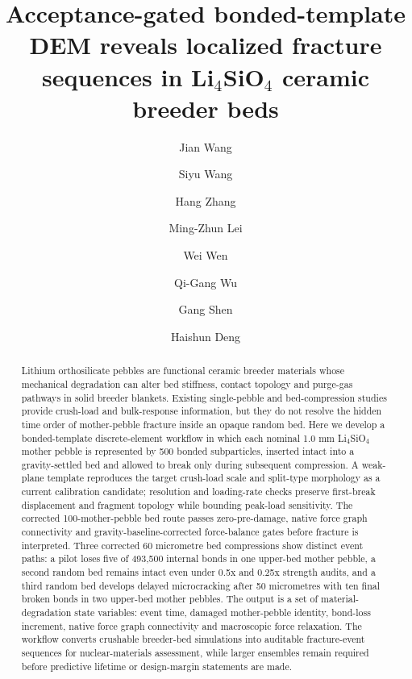 \documentclass[5p,twocolumn]{elsarticle}
\def\corref#1{}%
\begin{document}
\begin{frontmatter}
\title{\texorpdfstring{Acceptance-gated bonded-template DEM reveals localized fracture sequences in Li$_4$SiO$_4$ ceramic breeder beds}{Acceptance-gated bonded-template DEM reveals localized fracture sequences in Li4SiO4 ceramic breeder beds}}
\author[aff1,aff2]{Jian Wang\corref{cor1}}
\author[aff1]{Siyu Wang}
\author[aff1]{Hang Zhang}
\author[aff2]{Ming-Zhun Lei}
\author[aff1,aff2]{Wei Wen}
\author[aff2]{Qi-Gang Wu}
\author[aff1]{Gang Shen}
\author[aff1]{Haishun Deng}
\address[aff1]{Anhui University of Science and Technology, Huainan, Anhui 232001, China}
\address[aff2]{Institute of Plasma Physics, Chinese Academy of Sciences, Hefei, Anhui 230031, China}











\begin{abstract}

Lithium orthosilicate pebbles are functional ceramic breeder materials whose mechanical degradation can alter bed stiffness, contact topology and purge-gas pathways in solid breeder blankets. Existing single-pebble and bed-compression studies provide crush-load and bulk-response information, but they do not resolve the hidden time order of mother-pebble fracture inside an opaque random bed. Here we develop a bonded-template discrete-element workflow in which each nominal 1.0 mm Li$_4$SiO$_4$ mother pebble is represented by 500 bonded subparticles, inserted intact into a gravity-settled bed and allowed to break only during subsequent compression. A weak-plane template reproduces the target crush-load scale and split-type morphology as a current calibration candidate; resolution and loading-rate checks preserve first-break displacement and fragment topology while bounding peak-load sensitivity. The corrected 100-mother-pebble bed route passes zero-pre-damage, native force graph connectivity and gravity-baseline-corrected force-balance gates before fracture is interpreted. Three corrected 60 micrometre bed compressions show distinct event paths: a pilot loses five of 493,500 internal bonds in one upper-bed mother pebble, a second random bed remains intact even under 0.5x and 0.25x strength audits, and a third random bed develops delayed microcracking after 50 micrometres with ten final broken bonds in two upper-bed mother pebbles. The output is a set of material-degradation state variables: event time, damaged mother-pebble identity, bond-loss increment, native force graph connectivity and macroscopic force relaxation. The workflow converts crushable breeder-bed simulations into auditable fracture-event sequences for nuclear-materials assessment, while larger ensembles remain required before predictive lifetime or design-margin statements are made.



\end{abstract}
\end{frontmatter}
\end{document}

